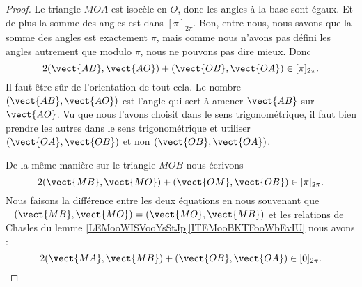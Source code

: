 \begin{proof}
    Le triangle \( MOA\) est isocèle en \( O\), donc les angles à la base sont égaux. Et de plus la somme des angles est dans \( [\pi]_{2\pi}\). Bon, entre nous, nous savons que la somme des angles est exactement \( \pi\), mais comme nous n'avons pas défini les angles autrement que modulo \( \pi\), nous ne pouvons pas dire mieux. Donc
    \begin{equation}
        2(\vect{ AB },\vect{ AO })+(\vect{ OB },\vect{ OA })\in [\pi]_{2\pi}.
    \end{equation}
    Il faut être sûr de l'orientation de tout cela. Le nombre \( (\vect{ AB },\vect{ AO })\) est l'angle qui sert à amener \( \vect{ AB }\) sur \( \vect{ AO }\). Vu que nous l'avons choisit dans le sens trigonométrique, il faut bien prendre les autres dans le sens trigonométrique et utiliser \( (\vect{ OA }, \vect{ OB })\) et non \( (\vect{ OB },\vect{ OA })\).

\begin{center}
   
\end{center}

De la même manière sur le triangle \( MOB\) nous écrivons
\begin{equation}
    2(\vect{ MB },\vect{ MO })+(\vect{ OM },\vect{ OB })\in[\pi]_{2\pi}.
\end{equation}
Nous faisons la différence entre les deux équations en nous souvenant que \( -(\vect{ MB },\vect{ MO })=(\vect{ MO },\vect{ MB })\) et les relations de Chasles du lemme \ref{LEMooWISVooYsStJp}\ref{ITEMooBKTFooWbEvIU} nous avons :
\begin{equation}
    2(\vect{ MA },\vect{ MB })+(\vect{ OB },\vect{ OA })\in[0]_{2\pi}.
\end{equation}
\end{proof}

